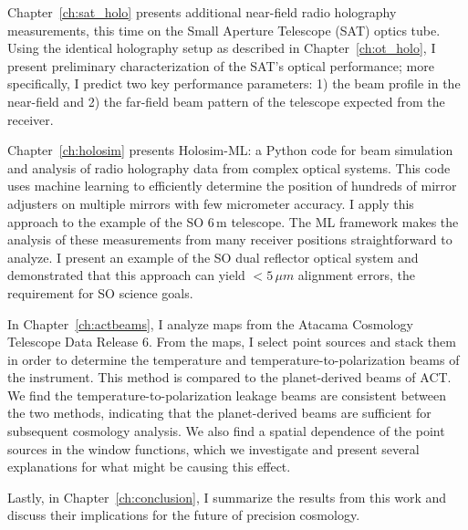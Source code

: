 Chapter~\ref{ch:sat_holo} presents additional near-field radio holography measurements, this time on the Small Aperture Telescope (SAT) optics tube.  Using the identical holography setup as described in Chapter~\ref{ch:ot_holo}, I present preliminary characterization of the SAT's optical performance; more specifically, I predict two key performance parameters: 1) the beam profile in the near-field and 2) the far-field beam pattern of the telescope expected from the receiver.

Chapter~\ref{ch:holosim} presents Holosim-ML: a Python code for beam simulation and analysis of radio holography data from complex optical systems.  This code uses machine learning to efficiently determine the position of hundreds of mirror adjusters on multiple mirrors with few micrometer accuracy.  I apply this approach to the example of the SO 6\,m telescope.  The ML framework makes the analysis of these measurements from many receiver positions straightforward to analyze.  I present an example of the SO dual reflector optical system and demonstrated that this approach can yield $<5\,\mu m$ alignment errors, the requirement for SO science goals.

In Chapter~\ref{ch:actbeams}, I analyze maps from the Atacama Cosmology Telescope Data Release 6.  From the maps, I select point sources and stack them in order to determine the temperature and temperature-to-polarization beams of the instrument.  This method is compared to the planet-derived beams of ACT.  We find the temperature-to-polarization leakage beams are consistent between the two methods, indicating that the planet-derived beams are sufficient for subsequent cosmology analysis.  We also find a spatial dependence of the point sources in the window functions, which we investigate and present several explanations for what might be causing this effect.

Lastly, in Chapter~\ref{ch:conclusion}, I summarize the results from this work and discuss their implications for the future of precision cosmology.